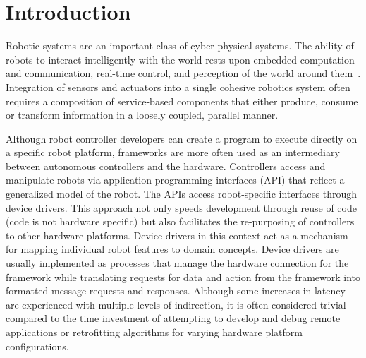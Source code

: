 \section{Introduction}
Robotic systems are an important class of cyber-physical systems. The ability of robots to interact intelligently with the world rests upon embedded computation and communication, real-time control, and perception of the world around them~\cite{Trinkle2008}. Integration of sensors and actuators into a single cohesive robotics system often requires a composition of service-based components that either produce, consume or transform information in a loosely coupled, parallel manner.


Although robot controller developers can create a program to execute directly on a specific robot platform, frameworks are more often used as an intermediary between autonomous controllers and the hardware.    Controllers access and manipulate robots via application programming interfaces (API) that reflect a generalized model of the robot.  The APIs access robot-specific interfaces through device drivers.  This approach not only speeds development through reuse of code (code is not hardware  specific) but also facilitates the re-purposing of controllers to other hardware platforms.  Device drivers in this context act as a mechanism for mapping individual robot features to domain concepts.   Device drivers are usually implemented as processes that manage the hardware connection for the framework while translating requests for data and action from the framework into formatted message requests and responses.   Although some increases in latency are experienced with multiple levels of indirection, it is often considered trivial compared to the time investment of attempting to develop and debug remote applications or retrofitting algorithms for varying hardware platform configurations.

